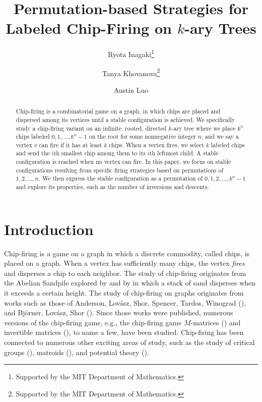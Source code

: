 \documentclass[final]{dmtcs-episciences}
\author[Ryota Inagaki et al.]{Ryota Inagaki\affiliationmark{1}\thanks{Supported by the MIT Department of Mathematics.}
  \and Tanya Khovanova\affiliationmark{1}\thanks{Supported by the MIT Department of Mathematics.}
  \and Austin Luo\affiliationmark{2}}
\title{Permutation-based Strategies for Labeled Chip-Firing on $k$-ary Trees}
\affiliation{
  Massachusetts Institute of Technology, Cambridge, USA\\
  Morgantown High School, Morgantown, USA}
\theoremstyle{definition}
\theoremstyle{remark}
\begin{document}

\maketitle
\begin{abstract}
  Chip-firing is a combinatorial game on a graph, in which chips are placed and dispersed among its vertices until a stable configuration is achieved. We specifically study a chip-firing variant on an infinite, rooted, directed $k$-ary tree where we place $k^n$ chips labeled $0,1,\dots, k^n-1$ on the root for some nonnegative integer $n$, and we say a vertex $v$ can fire if it has at least $k$ chips. When a vertex fires, we select $k$ labeled chips and send the $i$th smallest chip among them to its $i$th leftmost child. A stable configuration is reached when no vertex can fire. In this paper, we focus on stable configurations resulting from specific firing strategies based on permutations of $1, 2, \dots, n$. We then express the stable configuration as a permutation of $0,1, 2, \dots, k^n-1$ and explore its properties, such as the number of inversions and descents.
\end{abstract}

\section{Introduction}
\label{sec:in}
Chip-firing is a game on a graph in which a discrete commodity, called chips, is placed on a graph. When a vertex has sufficiently many chips, the vertex \textit{fires} and disperses a chip to each neighbor. The study of chip-firing originates from the Abelian Sandpile explored by \cite{PhysRevLett} and by \cite{dhar1999abelian} in which a stack of sand disperses when it exceeds a certain height. The study of chip-firing on graphs originates from works such as those of Anderson, Lovász, Shor, Spencer, Tardos, Winograd (\cite{zbMATH04135751}), and Björner, Lovász, Shor (\cite{MR1120415}). Since those works were published, numerous versions of the chip-firing game, e.g., the chip-firing game $M$-matrices (\cite{MR3311336}) and invertible matrices (\cite{MR3504984}), to name a few, have been studied. Chip-firing has been connected to numerous other exciting areas of study, such as the study of critical groups (\cite{MR1676732}), matroids (\cite{MR2179643}), and potential theory (\cite{MR2971705}).
\end{document}
